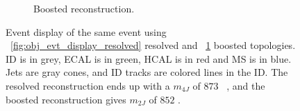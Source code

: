\begin{figure}[h!]
\begin{subfigure}[b]{0.45\textwidth}
        \caption{Boosted reconstruction.}
        \label{fig:obj_evt_display_boosted}
    \end{subfigure}
\caption{Event display of the same event using ~\ref{fig:obj_evt_display_resolved} resolved and ~\ref{fig:obj_evt_display_boosted} boosted topologies. ID is in grey, ECAL is in green, HCAL is in red and MS is in blue. Jets are gray cones, and ID tracks are colored lines in the ID. The resolved reconstruction ends up with a $m_{4J}$ of $873$ \GeV~, and the boosted reconstruction gives $m_{2J}$ of $852$ \GeV. }
\label{fig:obj_evt_display}
\end{figure}


